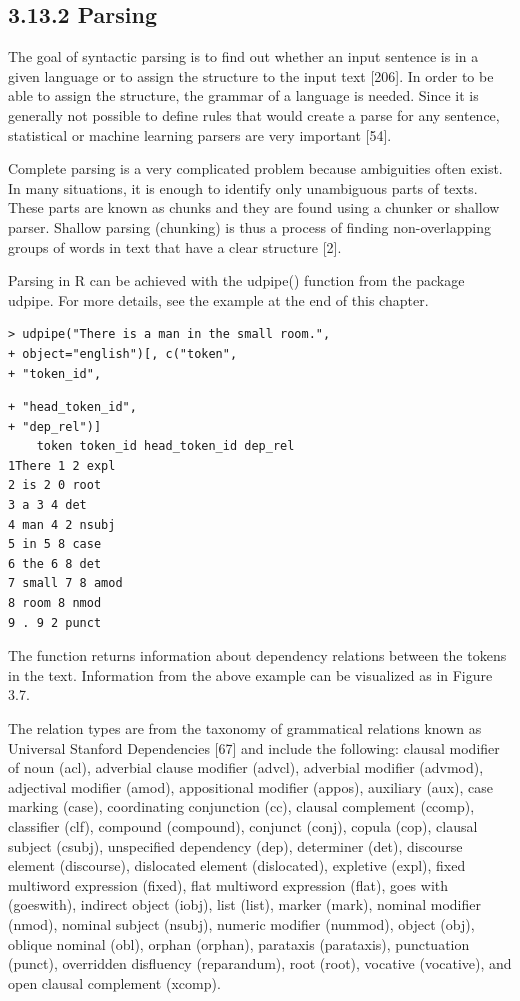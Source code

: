 \documentclass[10pt]{book}
\begin{document}
\subsection*{3.13.2 Parsing}
The goal of syntactic parsing is to find out whether an input sentence is in a given language or to assign the structure to the input text [206]. In order to be able to assign the structure, the grammar of a language is needed. Since it is generally not possible to define rules that would create a parse for any sentence, statistical or machine learning parsers are very important [54].

Complete parsing is a very complicated problem because ambiguities often exist. In many situations, it is enough to identify only unambiguous parts of texts. These parts are known as chunks and they are found using a chunker or shallow parser. Shallow parsing (chunking) is thus a process of finding non-overlapping groups of words in text that have a clear structure [2].

Parsing in R can be achieved with the udpipe() function from the package udpipe. For more details, see the example at the end of this chapter.

\begin{verbatim}
> udpipe("There is a man in the small room.",
+ object="english")[, c("token",
+ "token_id",
\end{verbatim}

\begin{verbatim}
+ "head_token_id",
+ "dep_rel")]
    token token_id head_token_id dep_rel
1There 1 2 expl
2 is 2 0 root
3 a 3 4 det
4 man 4 2 nsubj
5 in 5 8 case
6 the 6 8 det
7 small 7 8 amod
8 room 8 nmod
9 . 9 2 punct
\end{verbatim}

The function returns information about dependency relations between the tokens in the text. Information from the above example can be visualized as in Figure 3.7.

The relation types are from the taxonomy of grammatical relations known as Universal Stanford Dependencies [67] and include the following: clausal modifier of noun (acl), adverbial clause modifier (advcl), adverbial modifier (advmod), adjectival modifier (amod), appositional modifier (appos), auxiliary (aux), case marking (case), coordinating conjunction (cc), clausal complement (ccomp), classifier (clf), compound (compound), conjunct (conj), copula (cop), clausal subject (csubj), unspecified dependency (dep), determiner (det), discourse element (discourse), dislocated element (dislocated), expletive (expl), fixed multiword expression (fixed), flat multiword expression (flat), goes with (goeswith), indirect object (iobj), list (list), marker (mark), nominal modifier (nmod), nominal subject (nsubj), numeric modifier (nummod), object (obj), oblique nominal (obl), orphan (orphan), parataxis (parataxis), punctuation (punct), overridden disfluency (reparandum), root (root), vocative (vocative), and open clausal complement (xcomp).
\end{document}
